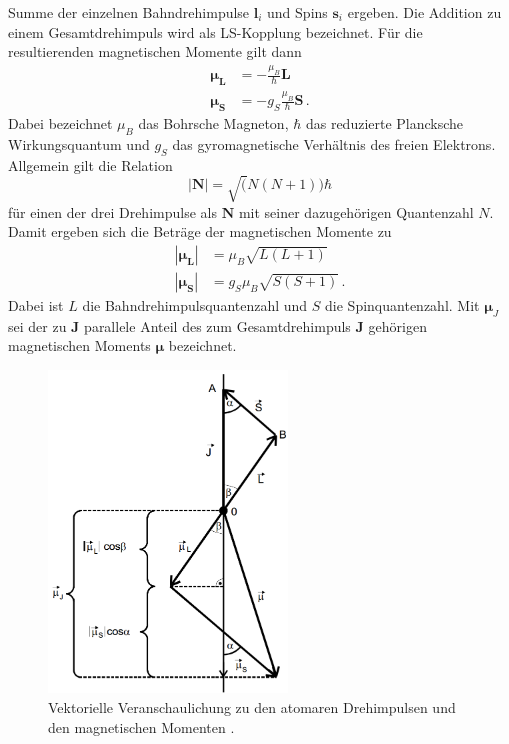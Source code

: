Summe der einzelnen Bahndrehimpulse $\symbf{l}_i$ und Spins $\symbf{s}_i$ ergeben.
Die Addition zu einem Gesamtdrehimpuls wird als LS-Kopplung bezeichnet. Für die
resultierenden magnetischen Momente gilt dann
\begin{align}
  \symbf{\mu_L} &= - \frac{\mu_B}{\hbar} \symbf{L} \,\\
  \symbf{\mu_S} &= - g_S \frac{\mu_B}{\hbar} \symbf{S} \,.
  \label{eqn:mulmus}
\end{align}
Dabei bezeichnet $\mu_B$ das Bohrsche Magneton, $\hbar$ das reduzierte Plancksche
Wirkungsquantum und $g_S$ das gyromagnetische Verhältnis des freien Elektrons.
Allgemein gilt die Relation
\begin{equation}
  |\symbf{N}| = \sqrt(N(N+1)) \hbar
\end{equation}
für einen der drei Drehimpulse als $\symbf{N}$ mit seiner dazugehörigen Quantenzahl
$N$. Damit ergeben sich die Beträge der magnetischen Momente zu
\begin{align}
  |\symbf{\mu_L}| &= \mu_B \sqrt{L(L+1)} \, \\
  |\symbf{\mu_S}| &= g_S \mu_B \sqrt{S(S+1)} \, .
\end{align}
Dabei ist $L$ die Bahndrehimpulsquantenzahl und $S$ die Spinquantenzahl.
Mit $\symbf{\mu}_J$ sei der zu $\symbf{J}$ parallele Anteil des zum Gesamtdrehimpuls $\symbf{J}$
gehörigen magnetischen Moments $\symbf{\mu}$ bezeichnet.

\begin{figure}
  \centering
  \includegraphics[width=180pt]{data/drehimpulse.png}
  \caption{Vektorielle Veranschaulichung zu den atomaren Drehimpulsen und den magnetischen Momenten \cite{Versuchsanleitung}.}
  \label{fig:vektordreh}
\end{figure}

